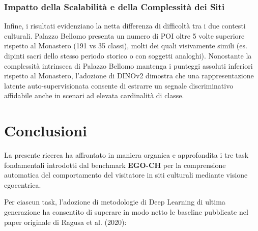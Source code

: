 \documentclass[a4paper,12pt]{report}
\begin{document}
\subsection{Impatto della Scalabilità e della Complessità dei Siti}

Infine, i risultati evidenziano la netta differenza di difficoltà tra i due contesti culturali. Palazzo Bellomo presenta un numero di POI oltre 5 volte superiore rispetto al Monastero (191 vs 35 classi), molti dei quali visivamente simili (es. dipinti sacri dello stesso periodo storico o con soggetti analoghi). Nonostante la complessità intrinseca di Palazzo Bellomo mantenga i punteggi assoluti inferiori rispetto al Monastero, l'adozione di DINOv2 dimostra che una rappresentazione latente auto-supervisionata consente di estrarre un segnale discriminativo affidabile anche in scenari ad elevata cardinalità di classe.

\chapter{Conclusioni}

La presente ricerca ha affrontato in maniera organica e approfondita i tre task fondamentali introdotti dal benchmark \textbf{EGO-CH} per la comprensione automatica del comportamento del visitatore in siti culturali mediante visione egocentrica.

Per ciascun task, l'adozione di metodologie di Deep Learning di ultima generazione ha consentito di superare in modo netto le baseline pubblicate nel paper originale di Ragusa et al. (2020):
\end{document}
